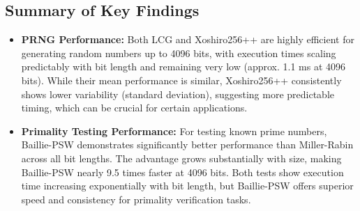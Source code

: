 \subsection{Summary of Key Findings}

\begin{itemize}
    \item \textbf{PRNG Performance:} Both LCG and Xoshiro256++ are highly efficient for generating random numbers up to 4096 bits, with execution times scaling predictably with bit length and remaining very low (approx. 1.1 ms at 4096 bits). While their mean performance is similar, Xoshiro256++ consistently shows lower variability (standard deviation), suggesting more predictable timing, which can be crucial for certain applications.
    \item \textbf{Primality Testing Performance:} For testing known prime numbers, Baillie-PSW demonstrates significantly better performance than Miller-Rabin across all bit lengths. The advantage grows substantially with size, making Baillie-PSW nearly 9.5 times faster at 4096 bits. Both tests show execution time increasing exponentially with bit length, but Baillie-PSW offers superior speed and consistency for primality verification tasks.
\end{itemize} 
